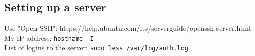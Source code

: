 \subsection{Setting up a server}
Use "Open SSH": https://help.ubuntu.com/lts/serverguide/openssh-server.html\\

My IP address: \texttt{hostname -I}\\
List of logins to the server: \texttt{sudo less /var/log/auth.log}\\

\vfill \null
\columnbreak